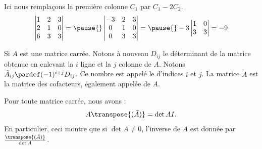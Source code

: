\begin{frame}
\begin{example}Ici nous remplaçons la première colonne \(C_{1}\) par \(C_{1} - 2 C_{2}\).
    \begin{equation*}
      \begin{vmatrix}
        1 & 2 & 3\\
        2 & 1 & 0\\
        6 & 3 & 3\\
      \end{vmatrix}
      = \pause{}
      \begin{vmatrix}
        -3 & 2 & 3\\
        0 & 1 & 0\\
        0 & 3 & 3\\
      \end{vmatrix}
      = \pause{}
      -3 \begin{vmatrix}
        1 & 0\\
        3 & 3\\
      \end{vmatrix}
      = -9
    \end{equation*}
  \end{example}
\end{frame}
\begin{frame}
  \begin{definition}
    Si \(A\) est une matrice carrée. Notons à nouveau \(D_{ij}\) le déterminant de la matrice obtenue en enlevant la \(i\)\ieme{} ligne et la \(j\)\ieme{} colonne de \(A\).\pause{} Notons \(\tilde{A}_{ij} \pardef (-1)^{i+j} D_{ij}\).\pause{} Ce nombre est appelé le  d'indices \(i\) et \(j\).\pause{} La matrice \(\tilde{A}\) est la matrice des cofacteurs, également appelée  de \(A\).
  \end{definition}\pause{}
  \begin{proposition}Pour toute matrice carrée, nous avons :
    \begin{equation*}
      A \transpose{(\tilde{A})} = \det{A} I.
    \end{equation*}\pause{}
    En particulier, ceci montre que si \(\det A \neq 0\), l'inverse de \(A\) est donnée par \(\frac{\transpose{(\tilde{A})}}{\det A}\).
  \end{proposition}
\end{frame}

